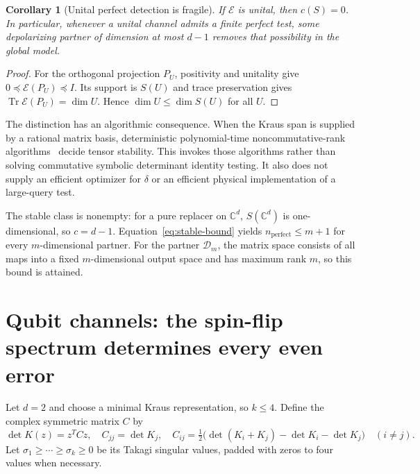 \documentclass[11pt,a4paper]{article}
\newtheorem{corollary}[theorem]{Corollary}
\theoremstyle{remark}\newtheorem{remark}[theorem]{Remark}
\DeclareMathOperator{\Tr}{Tr}
\newcommand{\E}{\mathcal E}
\newcommand{\CC}{\mathbb C}
\begin{document}
\begin{corollary}[Unital perfect detection is fragile]
If $\E$ is unital, then $c(S)=0$. In particular, whenever a unital channel admits a finite perfect test, some depolarizing partner of dimension at most $d-1$ removes that possibility in the global model.
\end{corollary}
\begin{proof}
For the orthogonal projection $P_U$, positivity and unitality give $0\preceq\E(P_U)\preceq I$. Its support is $S(U)$ and trace preservation gives $\Tr\E(P_U)=\dim U$. Hence $\dim U\le\dim S(U)$ for all $U$.
\end{proof}

The distinction has an algorithmic consequence. When the Kraus span is supplied by a rational matrix basis, deterministic polynomial-time noncommutative-rank algorithms~\cite{ggow,iqs} decide tensor stability. This invokes those algorithms rather than solving commutative symbolic determinant identity testing. It also does not supply an efficient optimizer for $\delta$ or an efficient physical implementation of a large-query test.

The stable class is nonempty: for a pure replacer on $\CC^d$, $S(\CC^d)$ is one-dimensional, so $c=d-1$. Equation~\eqref{eq:stable-bound} yields $n_{\mathrm{perfect}}\le m+1$ for every $m$-dimensional partner. For the partner $\mathcal D_m$, the matrix space consists of all maps into a fixed $m$-dimensional output space and has maximum rank $m$, so this bound is attained.

\section{Qubit channels: the spin-flip spectrum determines every even error}
Let $d=2$ and choose a minimal Kraus representation, so $k\le4$. Define the complex symmetric matrix $C$ by
\[
\det K(z)=z^TCz,\quad C_{jj}=\det K_j,\quad
C_{ij}=\tfrac12\bigl(\det(K_i+K_j)-\det K_i-\det K_j\bigr)\quad(i\ne j).
\]
Let $\sigma_1\ge\cdots\ge\sigma_k\ge0$ be its Takagi singular values, padded with zeros to four values when necessary.
\end{document}
